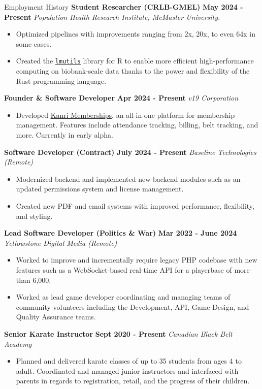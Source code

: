 \newcommand{\employer}[5]{%
	\entry*
	\textbf{#1} \hfill \textbf{#2 - #3}
	\newline
	\textit{#4}
	\begin{itemize}
		\setlength\parskip{-4pt}
		\vspace{-5pt}
		#5
	\end{itemize}
}

\newcommand{\link}[1]{\textcolor{MarkerColor}{\underline{#1}}}


\begin{rubric}{Employment History}
	\employer{Student Researcher (CRLB-GMEL)}{May 2024}{Present}{Population Health Research Institute, McMaster University.}{
		\item Optimized pipelines with improvements ranging from 2x, 20x, to even 64x in some cases.
		\item Created the \href{https://github.com/GMELab/lmutils.r}{\link{\texttt{lmutils}}} library for R to enable more efficient high-performance computing on biobank-scale data thanks to the power and flexibility of the Rust programming language.
	}
	\employer{Founder \& Software Developer}{Apr 2024}{Present}{v19 Corporation}{
		\item Developed \href{https://kanrimemberships.com}{\link{Kanri Memberships}}, an all-in-one platform for membership management. Features include attendance tracking, billing, belt tracking, and more. Currently in early alpha.
	}
	\employer{Software Developer (Contract)}{July 2024}{Present}{Baseline Technologies (Remote)}{
		\item Modernized backend and implemented new backend modules such as an updated permissions system and license management.
		\item Created new PDF and email systems with improved performance, flexibility, and styling.
	}
	\employer{Lead Software Developer (Politics \& War)}{Mar 2022}{June 2024}{Yellowstone Digital Media (Remote)}{
		\item Worked to improve and incrementally require legacy PHP codebase with new features such as a WebSocket-based real-time API for a playerbase of more than 6,000.
		\item Worked as lead game developer coordinating and managing teams of community volunteers including the Development, API, Game Design, and Quality Assurance teams.
	}
	\employer{Senior Karate Instructor}{Sept 2020}{Present}{Canadian Black Belt Academy}{
		\item Planned and delivered karate classes of up to 35 students from ages 4 to adult. Coordinated and managed junior instructors and interfaced with parents in regards to registration, retail, and the progress of their children.
	}
\end{rubric}
